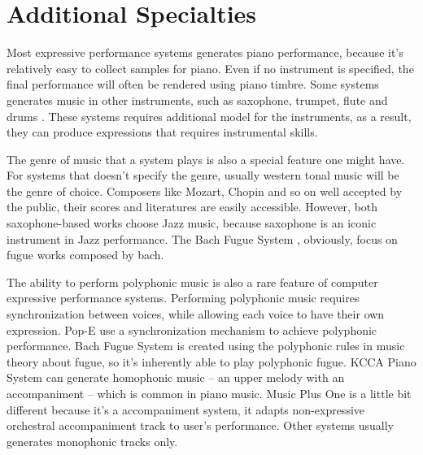 \section{Additional Specialties}

Most expressive performance systems generates piano performance, because it's relatively easy to collect samples for piano. Even if no instrument is specified, the final performance will often be rendered using piano timbre. Some systems generates music in other instruments, such as saxophone\cite{40, 41, 42}, trumpet\cite{24, 25}, flute \cite{39} and drums \cite{56}. These systems requires additional model for the instruments, as a result, they can produce expressions that requires instrumental skills.

The genre of music that a system plays is also a special feature one might have. For systems that doesn't specify the genre, usually western tonal music will be the genre of choice. Composers like Mozart, Chopin and so on well accepted by the public, their scores and literatures are easily accessible. However, both saxophone-based works choose Jazz music, because saxophone is an iconic instrument in Jazz performance. The Bach Fugue System \cite{23}, obviously, focus on fugue works composed by bach.

The ability to perform polyphonic music is also a rare feature of computer expressive performance systems. Performing polyphonic music requires synchronization between voices, while allowing each voice to have their own expression. Pop-E\cite{28} use a synchronization mechanism to achieve polyphonic performance. Bach Fugue System \cite{23} is created using the polyphonic rules in music theory about fugue, so it's inherently able to play polyphonic fugue. KCCA Piano System \cite{57}can generate homophonic music -- an upper melody with an accompaniment -- which is common in piano music.   Music Plus One \cite{52,53,54} is a little bit different because it's a accompaniment system, it adapts non-expressive orchestral accompaniment track to user's performance. Other systems usually generates monophonic tracks only. 

